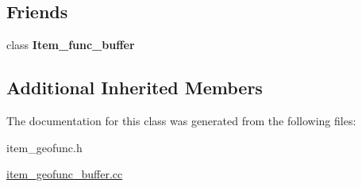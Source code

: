 \subsection*{Friends}
\begin{DoxyCompactItemize}
\item 
\mbox{\label{classItem__func__buffer__strategy_a7a2f0c347920faa7bbb513155a489a6c}} 
class {\bfseries Item\+\_\+func\+\_\+buffer}
\end{DoxyCompactItemize}
\subsection*{Additional Inherited Members}


The documentation for this class was generated from the following files\+:\begin{DoxyCompactItemize}
\item 
item\+\_\+geofunc.\+h\item 
\mbox{\hyperlink{item__geofunc__buffer_8cc}{item\+\_\+geofunc\+\_\+buffer.\+cc}}\end{DoxyCompactItemize}
